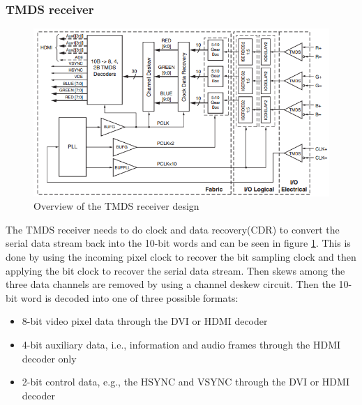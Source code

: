 \subsubsection{TMDS receiver}
\begin{figure}[h!]
    \centering
    \includegraphics[width=\linewidth]{img/TMDSreceiverdesign.png}
    \caption{Overview of the TMDS receiver design}
    \label{fig:TMDSReceiver}
\end{figure}
The TMDS receiver needs to do clock and data recovery(CDR) to convert the serial data stream back into the 10-bit words and can be seen in figure \ref{fig:TMDSReceiver}.
This is done by using the incoming pixel clock to recover the bit sampling clock and then applying the bit clock to recover the serial data stream.
Then skews among the three data channels are removed by using a channel deskew circuit.
Then the 10-bit word is decoded into one of three possible formats:
\begin{itemize}
    \item   8-bit video pixel data through the DVI or HDMI decoder
    \item   4-bit auxiliary data, i.e., information and audio frames through the HDMI decoder only
    \item   2-bit control data, e.g., the HSYNC and VSYNC through the DVI or HDMI decoder
\end{itemize}

